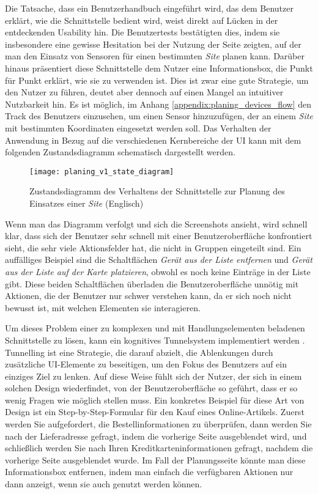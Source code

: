 Die Tatsache, dass ein Benutzerhandbuch eingeführt wird, das dem Benutzer erklärt, wie die Schnittstelle bedient wird, weist direkt auf Lücken in der entdeckenden Usability hin.
Die Benutzertests bestätigten dies, indem sie insbesondere eine gewisse Hesitation bei der Nutzung der Seite zeigten, auf der man den Einsatz von Sensoren für einen bestimmten \textit{Site} planen kann.
Darüber hinaus präsentiert diese Schnittstelle dem Nutzer eine Informationsbox, die Punkt für Punkt erklärt, wie sie zu verwenden ist.
Dies ist zwar eine gute Strategie, um den Nutzer zu führen, deutet aber dennoch auf einen Mangel an intuitiver Nutzbarkeit hin.
Es ist möglich, im Anhang \ref{appendix:planing_devices_flow} den Track des Benutzers einzusehen, um einen Sensor hinzuzufügen, der an einem \textit{Site} mit bestimmten Koordinaten eingesetzt werden soll.
Das Verhalten der Anwendung in Bezug auf die verschiedenen Kernbereiche der UI kann mit dem folgenden Zustandsdiagramm schematisch dargestellt werden.

\begin{figure}[H]
  \centering
  \texttt{[image: planing\_v1\_state\_diagram]}
  \caption{Zustandsdiagramm des Verhaltens der Schnittstelle zur Planung des Einsatzes einer \textit{Site} (Englisch)}
  \label{fig:planing_v1_state_diagram}
\end{figure}

Wenn man das Diagramm verfolgt und sich die Screenshots ansieht, wird schnell klar, dass sich der Benutzer sehr schnell mit einer Benutzeroberfläche konfrontiert sieht, die sehr viele Aktionsfelder hat, die nicht in Gruppen eingeteilt sind.
Ein auffälliges Beispiel sind die Schaltflächen \textit{Gerät aus der Liste entfernen} und \textit{Gerät aus der Liste auf der Karte platzieren}, obwohl es noch keine Einträge in der Liste gibt.
Diese beiden Schaltflächen überladen die Benutzeroberfläche unnötig mit Aktionen, die der Benutzer nur schwer verstehen kann, da er sich noch nicht bewusst ist, mit welchen Elementen sie interagieren.

Um dieses Problem einer zu komplexen und mit Handlungselementen beladenen Schnittstelle zu lösen, kann ein kognitives Tunnelsystem implementiert werden \cite{tunnelDesign}.
Tunnelling ist eine Strategie, die darauf abzielt, die Ablenkungen durch zusätzliche UI-Elemente zu beseitigen, um den Fokus des Benutzers auf ein einziges Ziel zu lenken.
Auf diese Weise fühlt sich der Nutzer, der sich in einem solchen Design wiederfindet, von der Benutzeroberfläche so geführt, dass er so wenig Fragen wie möglich stellen muss.
Ein konkretes Beispiel für diese Art von Design ist ein Step-by-Step-Formular für den Kauf eines Online-Artikels.
Zuerst werden Sie aufgefordert, die Bestellinformationen zu überprüfen, dann werden Sie nach der Lieferadresse gefragt, indem die vorherige Seite ausgeblendet wird, und schließlich werden Sie nach Ihren Kreditkarteninformationen gefragt, nachdem die vorherige Seite ausgeblendet wurde.
Im Fall der Planungsseite könnte man diese Informationsbox entfernen, indem man einfach die verfügbaren Aktionen nur dann anzeigt, wenn sie auch genutzt werden können.

